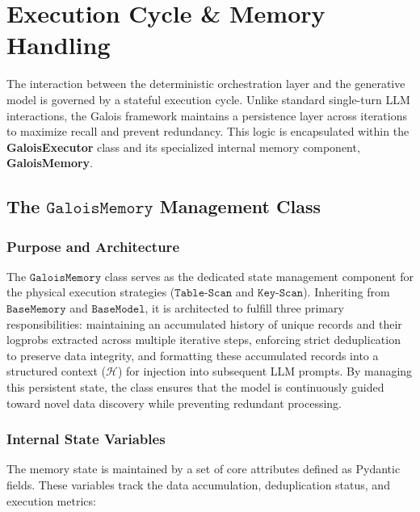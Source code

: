 \section{Execution Cycle \& Memory Handling}
The interaction between the deterministic orchestration layer and the generative model is governed by a stateful execution cycle. Unlike standard single-turn LLM interactions, the Galois framework maintains a persistence layer across iterations to maximize recall and prevent redundancy. This logic is encapsulated within the \textbf{GaloisExecutor} class and its specialized internal memory component, \textbf{GaloisMemory}.

\subsection{The $\texttt{GaloisMemory}$ Management Class}

\subsubsection{Purpose and Architecture}
The $\texttt{GaloisMemory}$ class serves as the dedicated state management component for the physical execution strategies ($\texttt{Table-Scan}$ and $\texttt{Key-Scan}$). Inheriting from $\texttt{BaseMemory}$ and $\texttt{BaseModel}$, it is architected to fulfill three primary responsibilities: maintaining an accumulated history of unique records and their logprobs extracted across multiple iterative steps, enforcing strict deduplication to preserve data integrity, and formatting these accumulated records into a structured context ($\mathcal{H}$) for injection into subsequent LLM prompts. By managing this persistent state, the class ensures that the model is continuously guided toward novel data discovery while preventing redundant processing.

\subsubsection{Internal State Variables}
The memory state is maintained by a set of core attributes defined as Pydantic fields. These variables track the data accumulation, deduplication status, and execution metrics:


